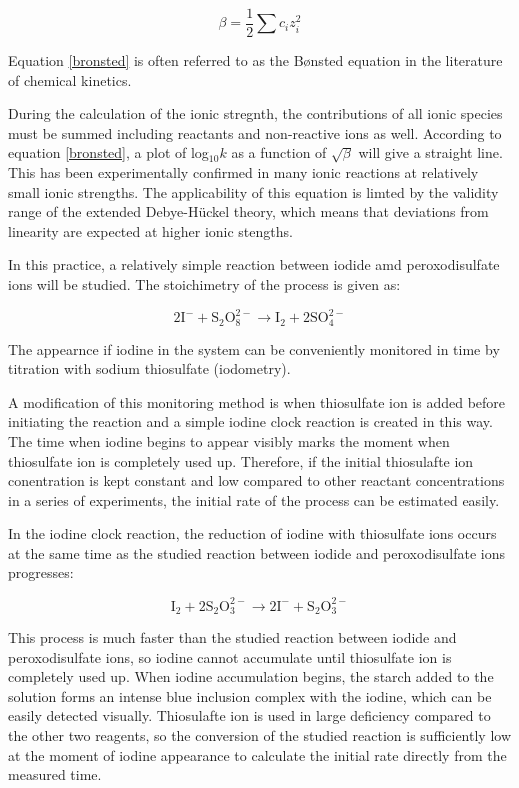 \begin{equation}
\beta = \frac{1}{2} \sum c_i z_i^2
\end{equation}

Equation \eqref{bronsted} is often referred to as the B\o nsted equation in the literature of chemical kinetics.

During the calculation of the ionic stregnth, the contributions of all ionic species must be summed including reactants and non-reactive ions as well. According to equation \eqref{bronsted}, a plot of log$_{10}k$ as a function of $\sqrt{\beta}$ will give a straight line. This has been experimentally confirmed in many ionic reactions at relatively small ionic strengths. The applicability of this equation is limted by the validity range of the extended Debye-H\"uckel theory, which means that deviations from linearity are expected at higher ionic stengths.

In this practice, a relatively simple reaction between iodide amd peroxodisulfate ions will be studied. The stoichimetry of the process is given as:

 \begin{equation}
2\text{I}^{-} + \text{S}_2 \text{O}_8^{2-} \longrightarrow \text{I}_{2} + 2 \text{SO}_{4}^{2-}
\end{equation}

The appearnce if iodine in the system can be conveniently monitored in time by titration with sodium thiosulfate (iodometry).

A modification of this monitoring method is when thiosulfate ion is added before initiating the reaction and a simple iodine clock reaction is created in this way. The time when iodine begins to appear visibly marks the moment when thiosulfate ion is completely used up. Therefore, if the initial thiosulafte ion conentration is kept constant and low compared to other reactant concentrations in a series of experiments, the initial rate of the process can be estimated easily.

In the iodine clock reaction, the reduction of iodine with thiosulfate ions occurs at the same time as the studied reaction between iodide and peroxodisulfate ions progresses:

\begin{equation}
\text{I}_{2} + 2 \text{S}_2 \text{O}_3^{2-}  \longrightarrow 2 \text{I}^{-}  + \text{S}_2 \text{O}_3^{2-}
\end{equation}

This process is much faster than the studied reaction between iodide and peroxodisulfate ions, so iodine cannot accumulate until thiosulfate ion is completely used up. When iodine accumulation begins, the starch added to the solution forms an intense blue inclusion complex with the iodine, which can be easily detected visually. Thiosulafte ion is used in large deficiency compared to the other two reagents, so the conversion of the studied reaction is sufficiently low at the moment of iodine appearance to calculate the initial rate directly from the measured time.


